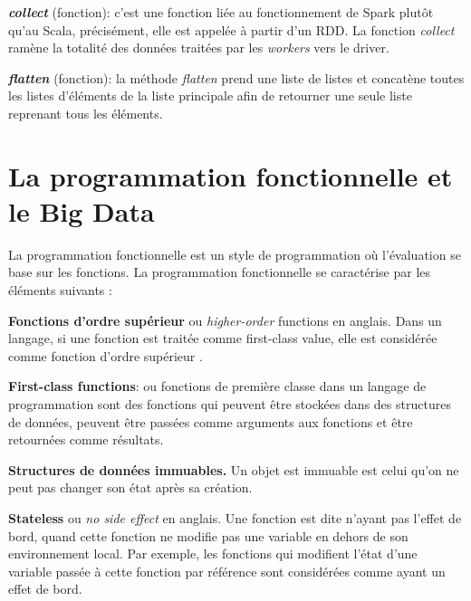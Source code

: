 \textit{\textbf{collect}} (fonction): c'est une fonction liée au fonctionnement de Spark plutôt qu'au Scala, précisément, elle est appelée à partir d'un RDD.    La fonction \textit{collect} ramène la totalité des données traitées par les \textit{workers} vers le driver.\par

\textit{\textbf{flatten}} (fonction): la méthode \textit{flatten}  prend une liste de listes et concatène toutes les listes d'éléments de la liste principale afin de retourner une seule liste reprenant tous les éléments. 

\section{La programmation fonctionnelle et le Big Data}

La programmation fonctionnelle est un style de programmation où l'évaluation se base sur les fonctions.  La programmation fonctionnelle se caractérise par les éléments suivants \cite{bigdatafunctional} :

\textbf{Fonctions d'ordre supérieur} ou  \textit{higher-order} functions en anglais. Dans un langage, si une fonction est traitée comme first-class value, elle est considérée comme fonction d'ordre supérieur \cite{DBLP:journals/csur/Hudak89}.
\begin{tcolorbox}
	\textbf{First-class functions}: ou fonctions de première classe dans un langage de programmation sont des fonctions qui peuvent être stockées dans des structures de données, peuvent être passées comme arguments aux fonctions et être retournées comme résultats.
\end{tcolorbox}
\par
\textbf{Structures de données immuables.} Un objet est immuable est celui qu'on ne peut pas changer son état après sa création. \par
\textbf{Stateless} ou \textit{no side effect} en anglais.  Une fonction est dite n'ayant pas  l'effet de bord, quand cette fonction ne modifie pas une variable en dehors de son environnement local. Par exemple, les fonctions qui modifient l'état d'une variable passée à cette fonction par référence sont considérées comme ayant un effet de bord.\par


